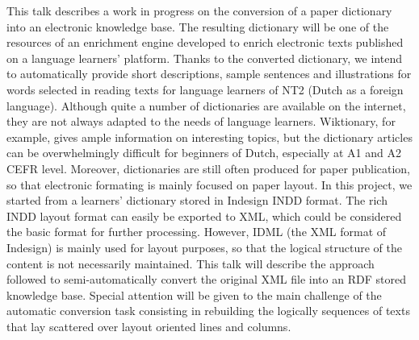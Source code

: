 \documentclass[10pt, a4paper, twopage, headinclude, footinclude, BCOR5mm]{book}
\begin{document}
\begin{table}[t!]
\end{table} 
\begin{table}[t!]
\end{table} 
\noindent
This talk describes a work in progress on the conversion of a paper dictionary into an electronic knowledge base. The resulting dictionary will be one of the resources of an enrichment engine developed to enrich electronic texts published on a language learners' platform. Thanks to the converted dictionary, we intend to automatically provide short descriptions, sample sentences and illustrations for words selected in reading texts for language learners of NT2 (Dutch as a foreign language).  Although quite a number of dictionaries are available on the internet, they are not always adapted to the needs of language learners. Wiktionary, for example, gives ample information on interesting topics, but the dictionary articles can be overwhelmingly difficult for beginners of Dutch, especially at A1 and A2 CEFR level. Moreover, dictionaries are still often produced for paper publication, so that electronic formating is mainly focused on paper layout.  In this project, we started from a learners' dictionary stored in Indesign INDD format. The rich INDD layout format can easily be exported to XML, which could be considered the basic format for further processing. However, IDML (the XML format of Indesign) is mainly used for layout purposes, so that the logical structure of the content is not necessarily maintained.  This talk will describe the approach followed to semi-automatically convert the original XML file into an RDF stored knowledge base. Special attention will be given to the main challenge of the automatic conversion task consisting in rebuilding the logically sequences of texts that lay scattered over layout oriented lines and columns.  
\end{document}
